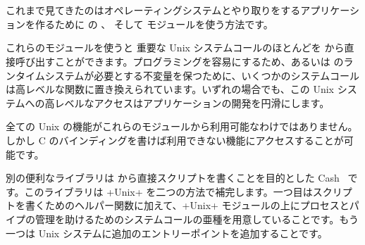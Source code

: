 %
%

\chapter*{\label{sec/more}}

これまで見てきたのはオペレーティングシステムとやり取りをするアプリケーションを作るために \ocaml の 、  そして  モジュールを使う方法です。

これらのモジュールを使うと 重要な Unix システムコールのほとんどを \ocaml から直接呼び出すことができます。プログラミングを容易にするため、あるいは \ocaml のランタイムシステムが必要とする不変量を保つために、いくつかのシステムコールは高レベルな関数に置き換えられています。いずれの場合でも、この Unix システムへの高レベルなアクセスはアプリケーションの開発を円滑にします。

全ての Unix の機能がこれらのモジュールから利用可能なわけではありません。しかし C のバインディングを書けば利用できない機能にアクセスすることが可能です。

別の便利なライブラリは \ocaml から直接スクリプトを書くことを目的とした Cash~\cite{Cash} です。このライブラリは \ml+Unix+ を二つの方法で補完します。一つ目はスクリプトを書くためのヘルパー関数に加えて、\ml+Unix+ モジュールの上にプロセスとパイプの管理を助けるためのシステムコールの亜種を用意していることです。もう一つは Unix システムに追加のエントリーポイントを追加することです。
